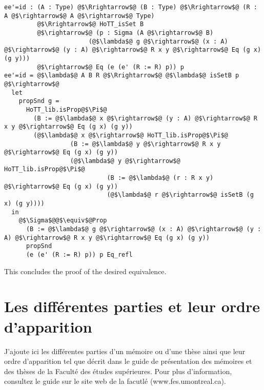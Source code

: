 \documentclass[12pt,twoside,maitrise]{dms}
\theoremstyle{definition}
\numberwithin{equation}{section}
\numberwithin{table}{chapter}
\numberwithin{figure}{chapter}
\begin{document}
\begin{verbatim}
ee'=id : (A : Type) @$\Rrightarrow$@ (B : Type) @$\Rrightarrow$@ (R : A @$\rightarrow$@ A @$\rightarrow$@ Type)
         @$\Rrightarrow$@ HoTT_isSet B
         @$\rightarrow$@ (p : Sigma (A @$\rightarrow$@ B)
                       (@$\lambda$@ g @$\rightarrow$@ (x : A) @$\rightarrow$@ (y : A) @$\rightarrow$@ R x y @$\rightarrow$@ Eq (g x) (g y)))
         @$\rightarrow$@ Eq (e (e' (R := R) p)) p
ee'=id = @$\lambda$@ A B R @$\Rrightarrow$@ @$\lambda$@ isSetB p @$\rightarrow$@
  let
    propSnd g =
      HoTT_lib.isProp@$\Pi$@
        (B := @$\lambda$@ x @$\rightarrow$@ (y : A) @$\rightarrow$@ R x y @$\rightarrow$@ Eq (g x) (g y))
        (@$\lambda$@ x @$\rightarrow$@ HoTT_lib.isProp@$\Pi$@
                  (B := @$\lambda$@ y @$\rightarrow$@ R x y @$\rightarrow$@ Eq (g x) (g y))
                  (@$\lambda$@ y @$\rightarrow$@ HoTT_lib.isProp@$\Pi$@
                            (B := @$\lambda$@ (r : R x y) @$\rightarrow$@ Eq (g x) (g y))
                            (@$\lambda$@ r @$\rightarrow$@ isSetB (g x) (g y))))
  in
    @$\Sigma$@@$\equiv$@Prop
      (B := @$\lambda$@ g @$\rightarrow$@ (x : A) @$\rightarrow$@ (y : A) @$\rightarrow$@ R x y @$\rightarrow$@ Eq (g x) (g y))
      propSnd
      (e (e' (R := R) p)) p Eq_refl
\end{verbatim}

This concludes the proof of the desired equivalence.

\chapter{Les différentes parties et leur ordre d'apparition}


J'ajoute ici les différentes parties d'un mémoire ou d'une thèse ainsi
que leur ordre d'apparition tel que décrit dans le guide de
présentation des mémoires et des thèses de la Faculté des études
supérieures.  Pour plus d'information, consultez le guide sur le site
web de la facutlé (www.fes.umontreal.ca).
\end{document}
